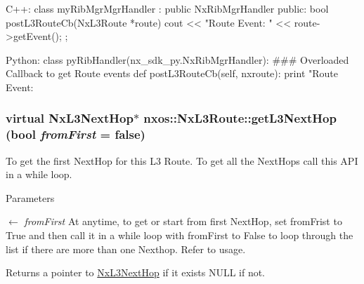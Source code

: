\begin{DoxyCode}
  C++:
     class myRibMgrMgrHandler : public NxRibMgrHandler {
        public:
           bool postL3RouteCb(NxL3Route *route) {
                cout << "Route Event: " << route->getEvent();
           }
     };

  Python:
     class pyRibHandler(nx_sdk_py.NxRibMgrHandler):
     ### Overloaded Callback to get Route events
           def postL3RouteCb(self, nxroute):
               print "Route Event: %
\end{DoxyCode}
 \hypertarget{classnxos_1_1NxL3Route_a7877c5328b1706acbbe5d8dbc6c94f4e}{
\subsubsection[{getL3NextHop}]{\setlength{\rightskip}{0pt plus 5cm}virtual {\bf NxL3NextHop}$\ast$ nxos::NxL3Route::getL3NextHop (bool {\em fromFirst} = {\ttfamily false})}}
\label{classnxos_1_1NxL3Route_a7877c5328b1706acbbe5d8dbc6c94f4e}
To get the first NextHop for this L3 Route. To get all the NextHops call this API in a while loop. 
\begin{DoxyParams}{Parameters}
\item[\mbox{$\leftarrow$} {\em fromFirst}]At anytime, to get or start from first NextHop, set fromFrist to True and then call it in a while loop with fromFirst to False to loop through the list if there are more than one Nexthop. Refer to usage. \end{DoxyParams}
\begin{DoxyReturn}{Returns}
a pointer to \hyperlink{classnxos_1_1NxL3NextHop}{NxL3NextHop} if it exists NULL if not.
\end{DoxyReturn}

